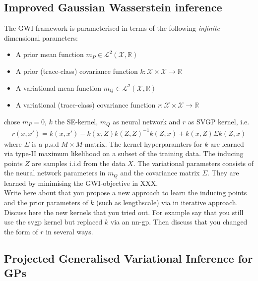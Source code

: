 \documentclass{article}
\newcommand{\bbR}{\mathbb{R}}
\newcommand{\calX}{\mathcal{X}}
\numberwithin{equation}{section}
\begin{document}
\subsection{Improved Gaussian Wasserstein inference }
The GWI framework is parameterised in terms of the following \textit{infinite}-dimensional parameters:
\begin{itemize}
    \item A prior mean function $m_P \in \mathcal{L}^2(\calX, \bbR)$
    \item A prior (trace-class) covariance function $k : \calX \times \calX \to \bbR$
    \item A variational mean function $m_Q \in \mathcal{L}^2(\calX, \bbR)$
    \item A variational (trace-class) covariance function $r: \calX \times \calX \to \bbR$
\end{itemize}
\citet{wild2022generalized} chose $m_P=0$, $k$ the SE-kernel, $m_Q$ as neural network and $r$ as SVGP kernel, i.e.
\begin{align}
    r(x,x') = k(x,x') - k(x,Z) k(Z,Z)^{-1} k(Z,x) + k(x,Z) \Sigma k(Z,x)
\end{align}
where $\Sigma$ is a p.s.d $M \times M$-matrix. The kernel hyperparamters for $k$ are learned via type-II maximum likelihood on a subset of the training data. The inducing points $Z$ are samples i.i.d from the data $X$. The variational parameters consists of the neural network parameters in $m_Q$ and the covariance matrix $\Sigma$. They are learned by minimising the GWI-objective in XXX. \\

Write here about that you propose a new approach to learn the inducing points and the prior parameters of $k$ (such as lengthscale) via in iterative approach. \\

Discuss here the new kernels that you tried out. For example say that you still use the svgp kernel but replaced $k$ via an nn-gp. Then discuss that you changed the form of $r$ in several ways.

\subsection{Projected Generalised Variational Inference for GPs}
\end{document}
